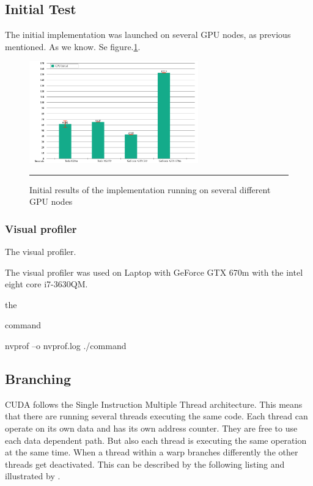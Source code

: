   

  
  
\subsection{Initial Test}

The initial implementation was launched on several GPU nodes, as previous mentioned.  As we know. Se figure.\ref{fig:iniresults}.

\begin{figure}[htbp]
	\centering
		\includegraphics[width=0.65\textwidth]{Figures/initial_results.png}
		\rule{35em}{0.2pt}
	\caption[Initial GPU results]{Initial results of the implementation running on several different GPU nodes}
	\label{fig:iniresults}
\end{figure}

\subsubsection{Visual profiler}

The visual profiler.

The visual profiler was used on Laptop with GeForce GTX 670m with the intel eight core i7-3630QM.


the

command

 nvprof –o nvprof.log ./command
 
 
 \subsection{Branching}
 
 CUDA follows the Single Instruction Multiple Thread architecture. This means that there are running several threads executing the same code. Each thread can operate on its own data and has its own address counter. They are free to use each data dependent path. But also each thread is executing the same operation at the same time. When a thread within a warp branches differently the other threads get deactivated. This can be described by the following listing and illustrated by \cite{hoermanngpu}.
 
